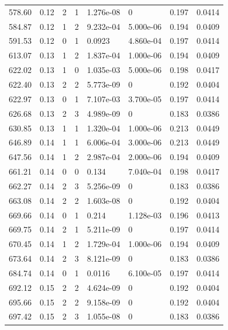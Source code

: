 \documentclass[preview]{standalone}
\begin{document}
{{{\begin{tabular}{L{1.2cm}C{1.2cm} C{0.3cm}C{0.5cm} C{1.4cm}C{1.4cm} C{1.4cm}C{1.4cm}}
  578.60  &  0.12  & 2     &  1 &  1.276e-08  & 0  & 0.197 &  0.0414   \\ 
  584.87  &  0.12  & 1     &  2 &  9.232e-04  & 5.000e-06  & 0.194 &  0.0409   \\ 
  591.53  &  0.12  & 0     &  1 &  0.0923  & 4.860e-04  & 0.197 &  0.0414   \\ 
  613.07  &  0.13  & 1     &  2 &  1.837e-04  & 1.000e-06  & 0.194 &  0.0409   \\ 
  622.02  &  0.13  & 1     &  0 &  1.035e-03  & 5.000e-06  & 0.198 &  0.0417   \\ 
  622.40  &  0.13  & 2     &  2 &  5.773e-09  & 0  & 0.192 &  0.0404   \\ 
  622.97  &  0.13  & 0     &  1 &  7.107e-03  & 3.700e-05  & 0.197 &  0.0414   \\ 
  626.68  &  0.13  & 2     &  3 &  4.989e-09  & 0  & 0.183 &  0.0386   \\ 
  630.85  &  0.13  & 1     &  1 &  1.320e-04  & 1.000e-06  & 0.213 &  0.0449   \\ 
  646.89  &  0.14  & 1     &  1 &  6.006e-04  & 3.000e-06  & 0.213 &  0.0449   \\ 
  647.56  &  0.14  & 1     &  2 &  2.987e-04  & 2.000e-06  & 0.194 &  0.0409   \\ 
  661.21  &  0.14  & 0     &  0 &  0.134  & 7.040e-04  & 0.198 &  0.0417   \\ 
  662.27  &  0.14  & 2     &  3 &  5.256e-09  & 0  & 0.183 &  0.0386   \\ 
  663.08  &  0.14  & 2     &  2 &  1.603e-08  & 0  & 0.192 &  0.0404   \\ 
  669.66  &  0.14  & 0     &  1 &  0.214  & 1.128e-03  & 0.196 &  0.0413   \\ 
  669.75  &  0.14  & 2     &  1 &  5.211e-09  & 0  & 0.197 &  0.0414   \\ 
  670.45  &  0.14  & 1     &  2 &  1.729e-04  & 1.000e-06  & 0.194 &  0.0409   \\ 
  673.64  &  0.14  & 2     &  3 &  8.121e-09  & 0  & 0.183 &  0.0386   \\ 
  684.74  &  0.14  & 0     &  1 &  0.0116  & 6.100e-05  & 0.197 &  0.0414   \\ 
  692.12  &  0.15  & 2     &  2 &  4.624e-09  & 0  & 0.192 &  0.0404   \\ 
  695.66  &  0.15  & 2     &  2 &  9.158e-09  & 0  & 0.192 &  0.0404   \\ 
  697.42  &  0.15  & 2     &  3 &  1.055e-08  & 0  & 0.183 &  0.0386   \\ 

\end{tabular}}}}
\end{document}
